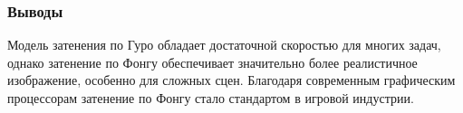 \subsubsection{Выводы}

\hspace{1.25cm}
Модель затенения по Гуро обладает достаточной скоростью для многих задач, однако затенение по Фонгу обеспечивает значительно более реалистичное изображение, особенно для сложных сцен. Благодаря современным графическим процессорам затенение по Фонгу стало стандартом в игровой индустрии.~\cite{compgraphics}


\newpage